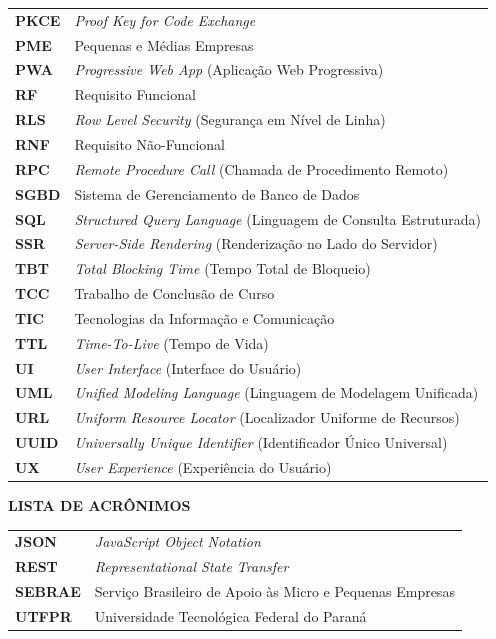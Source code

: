 \documentclass[12pt,a4paper]{article}
\begin{document}
\begin{tabularx}{\textwidth}{@{}lX@{}}
\textbf{PKCE} & \textit{Proof Key for Code Exchange} \\
\textbf{PME} & Pequenas e Médias Empresas \\
\textbf{PWA} & \textit{Progressive Web App} (Aplicação Web Progressiva) \\
\textbf{RF} & Requisito Funcional \\
\textbf{RLS} & \textit{Row Level Security} (Segurança em Nível de Linha) \\
\textbf{RNF} & Requisito Não-Funcional \\
\textbf{RPC} & \textit{Remote Procedure Call} (Chamada de Procedimento Remoto) \\
\textbf{SGBD} & Sistema de Gerenciamento de Banco de Dados \\
\textbf{SQL} & \textit{Structured Query Language} (Linguagem de Consulta Estruturada) \\
\textbf{SSR} & \textit{Server-Side Rendering} (Renderização no Lado do Servidor) \\
\textbf{TBT} & \textit{Total Blocking Time} (Tempo Total de Bloqueio) \\
\textbf{TCC} & Trabalho de Conclusão de Curso \\
\textbf{TIC} & Tecnologias da Informação e Comunicação \\
\textbf{TTL} & \textit{Time-To-Live} (Tempo de Vida) \\
\textbf{UI} & \textit{User Interface} (Interface do Usuário) \\
\textbf{UML} & \textit{Unified Modeling Language} (Linguagem de Modelagem Unificada) \\
\textbf{URL} & \textit{Uniform Resource Locator} (Localizador Uniforme de Recursos) \\
\textbf{UUID} & \textit{Universally Unique Identifier} (Identificador Único Universal) \\
\textbf{UX} & \textit{User Experience} (Experiência do Usuário) \\
\end{tabularx}

\vspace{1.0cm}
\centering
{\textbf{LISTA DE ACRÔNIMOS} \par}
\vspace{0.6cm}
\justifying
\noindent
\begin{tabularx}{\textwidth}{@{}lX@{}}
\textbf{JSON} & \textit{JavaScript Object Notation} \\
\textbf{REST} & \textit{Representational State Transfer} \\
\textbf{SEBRAE} & Serviço Brasileiro de Apoio às Micro e Pequenas Empresas \\
\textbf{UTFPR} & Universidade Tecnológica Federal do Paraná \\
\end{tabularx}
\end{document}
